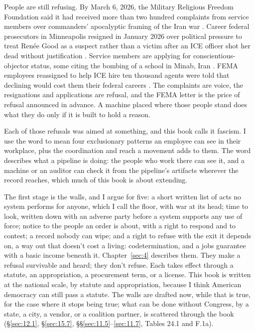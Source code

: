 People are still refusing. By March 6, 2026, the Military Religious Freedom Foundation said it had received more than two hundred complaints from service members over commanders' apocalyptic framing of the Iran war \autocite{Snopes2026MRFF}. Career federal prosecutors in Minneapolis resigned in January 2026 over political pressure to treat Renée Good as a suspect rather than a victim after an ICE officer shot her dead without justification \autocite{Kaplan2026MinnProsecutors,CBS2026MinnFraudProsecutors,Wikipedia2026ReneeGood}. Service members are applying for conscientious-objector status, some citing the bombing of a school in Minab, Iran \autocite{Sridhar2026CO}. FEMA employees reassigned to help ICE hire ten thousand agents were told that declining would cost them their federal careers \autocite{Dayen2025FEMAICE,Stanton2026FEMALetter}. The complaints are voice, the resignations and applications are refusal, and the FEMA letter is the price of refusal announced in advance. A machine placed where those people stand does what they do only if it is built to hold a reason.

Each of those refusals was aimed at something, and this book calls it fascism. I use the word to mean four exclusionary patterns an employee can see in their workplace, plus the coordination and reach a movement adds to them. The word describes what a pipeline is doing: the people who work there can see it, and a machine or an auditor can check it from the pipeline's artifacts wherever the record reaches, which much of this book is about extending.

The first stage is the walls, and I argue for five: a short written list of acts no system performs for anyone, which I call the floor, with war at its head; time to look, written down with an adverse party before a system supports any use of force; notice to the people an order is about, with a right to respond and to contest; a record nobody can wipe; and a right to refuse with the exit it depends on, a way out that doesn't cost a living: codetermination, and a jobs guarantee with a basic income beneath it. Chapter~\ref{sec:4} describes them. They make a refusal survivable and heard; they don't refuse. Each takes effect through a statute, an appropriation, a procurement term, or a license. This book is written at the national scale, by statute and appropriation, because I think American democracy can still pass a statute. The walls are drafted now, while that is true, for the case where it stops being true; what can be done without Congress, by a state, a city, a vendor, or a coalition partner, is scattered through the book (\S\ref{sec:12.1}, \S\ref{sec:15.7}, \S\S\ref{sec:11.5}–\ref{sec:11.7}, Tables 24.1 and F.1a).


